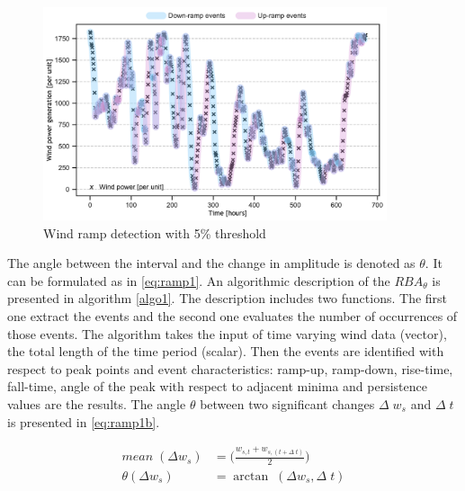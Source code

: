  
   \begin{figure}[!htbp]
    \centering
    \includegraphics[width=0.9\textwidth]{./sec/fig/RBAevents.pdf}%
    \caption{Wind ramp detection with 5\% threshold}
    \label{fig:ramp_theta}
\end{figure}
The angle between the interval and the change in amplitude is denoted as $\theta$. It can be formulated as in \eqref{eq:ramp1}. An algorithmic description of the $RBA_\theta$ is presented in algorithm \ref{algo1}. The description includes two functions. The first one extract the events and the second one evaluates the number of occurrences of those events. The algorithm takes the input of time varying wind data (vector), the total length of the time period (scalar). Then the events are identified with respect to peak points and event characteristics: ramp-up, ramp-down, rise-time, fall-time, angle of the peak with respect to adjacent minima and persistence values are the results. The angle $\theta$ between two significant changes $\Delta \; w_s$ and $\Delta \; t$ is presented in \eqref{eq:ramp1b}. 


\begin{subequations} \label{eq:ramp1}
\begin{align}
    \textit{mean} \; ( \Delta w_{s}) & = \bigg( \frac{ w_{s,t} + w_{s, (t + \Delta \; t)}}{2} \bigg) \label{eq:ramp1a}\\
    \theta ( \Delta w_{s}) &= \arctan \; ( \Delta w_{s},  \Delta \; t) \label{eq:ramp1b}
\end{align}
\end{subequations}


